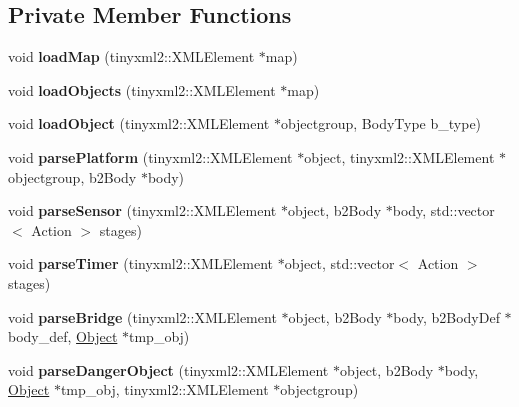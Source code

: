 \subsection*{Private Member Functions}
\begin{DoxyCompactItemize}
\item 
\mbox{\label{class_level_ac95aee215b31865a7f010d077e9e59b8}} 
void {\bfseries load\+Map} (tinyxml2\+::\+X\+M\+L\+Element $\ast$map)
\item 
\mbox{\label{class_level_a366a0ac7ecbca8e3fa56d8e271d155a9}} 
void {\bfseries load\+Objects} (tinyxml2\+::\+X\+M\+L\+Element $\ast$map)
\item 
\mbox{\label{class_level_a69835ba3b93667d000f1bd7feece7217}} 
void {\bfseries load\+Object} (tinyxml2\+::\+X\+M\+L\+Element $\ast$objectgroup, Body\+Type b\+\_\+type)
\item 
\mbox{\label{class_level_a2d4fd0491266cd6635edeb1f9b24d373}} 
void {\bfseries parse\+Platform} (tinyxml2\+::\+X\+M\+L\+Element $\ast$object, tinyxml2\+::\+X\+M\+L\+Element $\ast$objectgroup, b2\+Body $\ast$body)
\item 
\mbox{\label{class_level_afe367884e3e0e7e1ca1870566eababd8}} 
void {\bfseries parse\+Sensor} (tinyxml2\+::\+X\+M\+L\+Element $\ast$object, b2\+Body $\ast$body, std\+::vector$<$ Action $>$ stages)
\item 
\mbox{\label{class_level_a0230969dca0cd75ab48e212c3ec559ce}} 
void {\bfseries parse\+Timer} (tinyxml2\+::\+X\+M\+L\+Element $\ast$object, std\+::vector$<$ Action $>$ stages)
\item 
\mbox{\label{class_level_aa1921baab6b1d686f68d81efd235ebc4}} 
void {\bfseries parse\+Bridge} (tinyxml2\+::\+X\+M\+L\+Element $\ast$object, b2\+Body $\ast$body, b2\+Body\+Def $\ast$body\+\_\+def, \hyperlink{class_object}{Object} $\ast$tmp\+\_\+obj)
\item 
\mbox{\label{class_level_a4e4b69194e33200fff8f9b0282e10559}} 
void {\bfseries parse\+Danger\+Object} (tinyxml2\+::\+X\+M\+L\+Element $\ast$object, b2\+Body $\ast$body, \hyperlink{class_object}{Object} $\ast$tmp\+\_\+obj, tinyxml2\+::\+X\+M\+L\+Element $\ast$objectgroup)

\end{DoxyCompactItemize}
